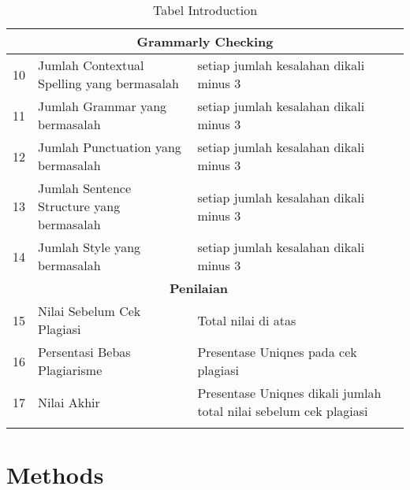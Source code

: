 \begin{longtable}{|p{}|p{}|p{}|p{}|}
\multicolumn{4}{c}{\textbf{Grammarly Checking}}\\ \hline

10 &Jumlah Contextual Spelling yang bermasalah&setiap jumlah kesalahan dikali minus 3& \\ \hline

11 &Jumlah Grammar yang bermasalah&setiap jumlah kesalahan dikali minus 3& \\ \hline

12 &Jumlah Punctuation yang bermasalah&setiap jumlah kesalahan dikali minus 3& \\ \hline

13 &Jumlah Sentence Structure yang bermasalah&setiap jumlah kesalahan dikali minus 3& \\ \hline

14 &Jumlah Style yang bermasalah&setiap jumlah kesalahan dikali minus 3& \\ \hline

\multicolumn{3}{c}{\textbf{Penilaian}}\\ \hline

15 &Nilai Sebelum Cek Plagiasi&Total nilai di atas& \\ \hline

16 &Persentasi Bebas Plagiarisme&Presentase Uniqnes pada cek plagiasi& \\ \hline

17 &Nilai Akhir&Presentase Uniqnes dikali jumlah total nilai sebelum cek plagiasi& \\ \hline

\caption{Tabel Introduction}
\label{table:intro}
\end{longtable}



\section{Methods}

